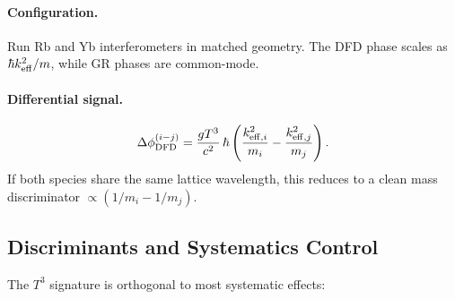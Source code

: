 \paragraph{Configuration.}
Run Rb and Yb interferometers in matched geometry. The DFD phase scales as $\hbar k_{\rm eff}^2/m$, while GR phases are common-mode.

\paragraph{Differential signal.}
\begin{equation}
\Delta\phi_{\rm DFD}^{(i-j)} = \frac{g T^3}{c^2}\,\hbar\left(\frac{k_{{\rm eff},i}^2}{m_i} - \frac{k_{{\rm eff},j}^2}{m_j}\right).
\end{equation}
If both species share the same lattice wavelength, this reduces to a clean mass discriminator $\propto (1/m_i - 1/m_j)$.

\subsection{Discriminants and Systematics Control}\label{sec:mw-systematics}

The $T^3$ signature is orthogonal to most systematic effects:

\begin{table}[h]
\centering
\caption{Systematics overview and discriminants. The DFD signal is unique in showing $T^3$ scaling, rotation sign flip, and even $k$-parity.}\label{tab:mw-sys}
\renewcommand{\arraystretch}{1.2}
\end{table}

